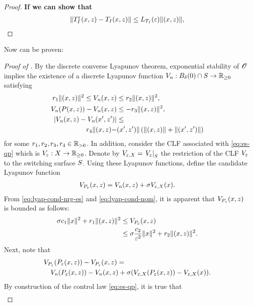 \documentclass[twocolumn]{article}
\begin{document}
\begin{proof}
{\bf If we can show that}
\begin{align*}
  \| \TIe\argsxz - \TI\argsxz \| \leq \LTIeps \nzdxz,
\end{align*}

\end{proof}

Now  can be proven:
\begin{proof} [Proof of ]
  By the discrete converse Lyapunov theorem, exponential stability of $\Orbit$ implies the existence of a discrete Lyapunov function $\Vn : B_{\delta}(0) \cap \S \to \Rnn$ satisfying
  \begin{align}
    \label{eq:lyap-cond-nom}
    r_{1} \nzdxz^{2} \leq \Vn\argsxz &\leq r_{2} \nzdxz^2,\\
    \nonumber
    \Vn(\P\argsxz) - \Vn\argsxz &\leq -r_{3} \nzdxz^{2},\\
    \nonumber
    | \Vn\argsxz - \Vn(\zdx', \zdz') | &\leq\\
    \nonumber
    r_{4} \| \argsxz - &\argsxzprime \| \left( \nzdxz + \nzdxzprime\right)
  \end{align}
  for some $r_{1}, r_{2}, r_{3}, r_{4} \in \Rpd$.
  In addition, consider the CLF associated with \eqref{eq:es-qp} which is $\Ve : \zdX \to \Rnn$.
  Denote by $\Vex = \VeS$ the restriction of the CLF $\Ve$ to the switching surface $\S$.
  Using these Lyapunov functions, define the candidate Lyapunov function
  \begin{align}
    \VP\argsxz = \Vn\argsxz + \sigma \Vex(\zdx).
  \end{align}
  From \eqref{eq:lyap-cond-nrg-es} and \eqref{eq:lyap-cond-nom}, it is apparent that $\VP\argsxz$ is bounded as follows:
  \begin{align}
    \sigma c_{1} \nzdx^{2} + r_{1} \nzdxz^{2} &\leq \VP\argsxz\\
    \nonumber
    &\leq \sigma \frac{c_{2}}{\resclfparam^{2}} \nzdx^{2} + r_{2} \nzdxz^{2}.
  \end{align}
  Next, note that
  \begin{align}
    \label{eq:composite-lyap}
    \lefteqn{\VP(\Pe\argsxz) - \VP\argsxz =}\\
    \nonumber
      &&\Vn(\Pe\argsxz) - \Vn\argsxz + \sigma(\Vex(\Pe\argsxz) - \Vex(\zdx)).
  \end{align}
  By construction of the control law \eqref{eq:es-qp}, it is true that
  \begin{align}
    \label{eq:Veh-bound}

\end{align}
\end{proof}
\end{document}
